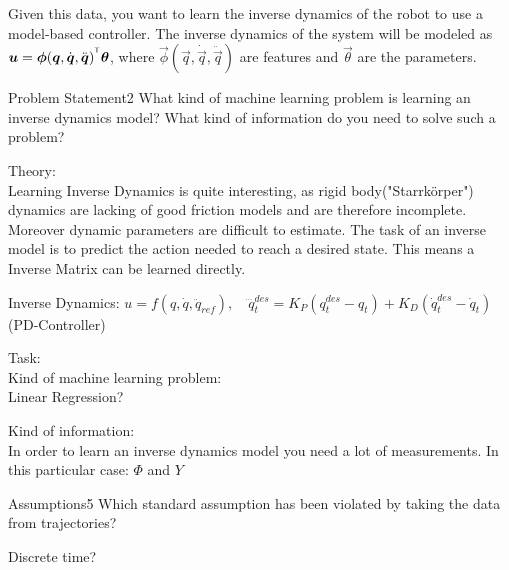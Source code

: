 Given this data, you want to learn the inverse dynamics of the robot to use a model-based controller.
The inverse dynamics of the system will be modeled as ${\boldsymbol{u}}={\boldsymbol{\phi}}({\boldsymbol{q}},\dot{{\boldsymbol{q}}},\ddot{{\boldsymbol{q}}})^{^\mathsf{T}}{\boldsymbol{\theta}}$, where $\vec{\phi}(\vec{q},\dot{\vec{q}},\ddot{\vec{q}})$ are features and $\vec{\theta}$ are the parameters.

\begin{questions}


\begin{question}{Problem Statement}{2}
What kind of machine learning problem is learning an inverse dynamics model? What kind of information do you need to solve such a problem?

\begin{answer}
	Theory:\\
	Learning Inverse Dynamics is quite interesting, as rigid body("Starrk\"orper") dynamics are lacking of good friction models and are therefore incomplete. Moreover dynamic parameters are difficult to estimate. The task of an inverse model is to predict the action needed to reach a desired state. This means a Inverse Matrix can be learned directly.
	
	Inverse Dynamics: $u=f(q,\dot{q},\ddot{q}_{ref}), \quad \dddot{q}_t^{des}=K_P(q_t^{des}-q_t)+K_D(\dot{q}_t^{des}-\dot{q}_t)$ (PD-Controller)
	
	Task:\\
	Kind of machine learning problem:\\
	Linear Regression? 
	
	Kind of information:\\
	In order to learn an inverse dynamics model you need a lot of measurements. In this particular case:
	$\Phi$ and $Y$


	\end{answer}

\end{question}



\begin{question}{Assumptions}{5}
Which standard assumption has been violated by taking the data from trajectories?

\begin{answer}
	Discrete time?
	\end{answer}

\end{question}


\end{questions}
